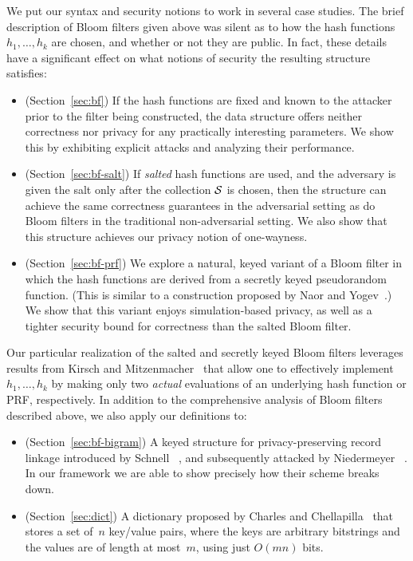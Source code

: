 %
We put our syntax and security notions to work in several case studies.
%
The brief description of Bloom filters given above was silent as to how the hash
functions $h_1, \ldots, h_k$ are chosen, and whether or not they are
public. In fact, these details have a significant effect on what notions of
security the resulting structure satisfies:
\begin{itemize}
  \item
    (Section~\ref{sec:bf}) If the hash functions are fixed and known to the
    attacker prior to the filter being constructed, the data structure offers
    neither correctness nor privacy for any practically interesting parameters.
    We show this by exhibiting explicit attacks and analyzing their performance.

  \item (Section~\ref{sec:bf-salt}) If \emph{salted} hash functions are used,
    and the adversary is given the salt only after the collection $\mathcal{S}$ is
    chosen, then %
    the structure can achieve the same correctness guarantees in the adversarial setting as do Bloom filters in the traditional
    non-adversarial setting. 
    We also show that this structure achieves our privacy notion of one-wayness.

  \item (Section~\ref{sec:bf-prf}) We explore a natural, keyed variant of a
    Bloom filter in which the hash functions are derived from a secretly keyed
    pseudorandom function. (This is similar to a construction proposed by Naor
    and Yogev~\cite{naor2015bloom}.) We show that this variant enjoys
    simulation-based privacy, as well as a tighter security bound for
    correctness than the salted Bloom filter.
\end{itemize}
%
\noindent
Our particular realization of the salted and secretly keyed Bloom filters
leverages results from Kirsch and Mitzenmacher~\cite{kirsch2006less} that allow
one to effectively implement $h_1,\ldots, h_k$ by making only two \emph{actual}
evaluations of an underlying hash function or PRF, respectively.
%
In addition to the comprehensive analysis of Bloom filters described above, we
also apply our definitions to:
\begin{itemize}
  \item (Section~\ref{sec:bf-bigram}) A keyed structure for privacy-preserving
    record linkage introduced by Schnell \etal~\cite{schnell2011novel}, and
    subsequently attacked by Niedermeyer
    \etal~\cite{niedermeyer2014cryptanalysis}. In our framework we are able to
    show precisely how their scheme breaks down.

  \item (Section~\ref{sec:dict}) A dictionary proposed by Charles
    and Chellapilla~\cite{charles2008bloomier2} that stores a set of~$n$
    key/value pairs, where the keys are arbitrary bitstrings and the values are
    of length at most~$m$, using just $O(mn)$ bits.
\end{itemize}

